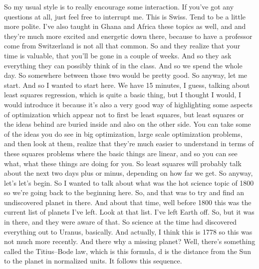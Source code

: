 \documentclass[11pt,a4paper]{article}
\begin{document}
So my usual style is to really encourage some interaction. If you've got any questions at all, just feel free to interrupt me. This is Swiss. Tend to be a little more polite. I've also taught in Ghana and Africa these topics as well, and and they're much more excited and energetic down there, because to have a professor come from Switzerland is not all that common. So and they realize that your time is valuable, that you'll be gone in a couple of weeks. And so they ask everything they can possibly think of in the class. And so we spend the whole day. So somewhere between those two would be pretty good. So anyway, let me start. And so I wanted to start here. We have 15 minutes, I guess, talking about least squares regression, which is quite a basic thing, but I thought I would, I would introduce it because it's also a very good way of highlighting some aspects of optimization which appear not to first be least squares, but least squares or the ideas behind are buried inside and also on the other side. You can take some of the ideas you do see in big optimization, large scale optimization problems, and then look at them, realize that they're much easier to understand in terms of these squares problems where the basic things are linear, and so you can see what, what these things are doing for you. So least squares will probably talk about the next two days plus or minus, depending on how far we get. So anyway, let's let's begin. So I wanted to talk about what was the hot science topic of 1800 so we're going back to the beginning here. So, and that was to try and find an undiscovered planet in there. And about that time, well before 1800 this was the current list of planets I've left. Look at that list. I've left Earth off. So, but it was in there, and they were aware of that. So science at the time had discovered everything out to Uranus, basically. And actually, I think this is 1778 so this was not much more recently. And there why a missing planet? Well, there's something called the Titius--Bode law, which is this formula, d is the distance from the Sun to the planet in normalized units. It follows this sequence.
\end{document}
